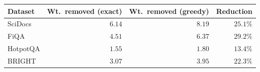 \begin{supplementtable}
  \caption{Structural gap on cyclic instances ($n=379$, pooled regimes):
    mean feedback-arc weight removed by exact versus greedy repair.
    Relative reduction is from greedy to exact. Retrieval-level
    exact-versus-greedy and exact-versus-unrepaired Holm outcomes appear
    in the accompanying text (all nonsignificant after correction).}
  \label{tab:exact-vs-greedy}
  \sncstable
  \begin{tabular}{@{}lrrr@{}}
    \toprule
    Dataset & Wt.\ removed (exact) & Wt.\ removed (greedy) & Reduction \\
    \midrule
    SciDocs  & $6.14$ & $8.19$ & $25.1\%$ \\
    \addlinespace
    FiQA     & $4.51$ & $6.37$ & $29.2\%$ \\
    \addlinespace
    HotpotQA & $1.55$ & $1.80$ & $13.4\%$ \\
    \addlinespace
    BRIGHT   & $3.07$ & $3.95$ & $22.3\%$ \\
    \bottomrule
  \end{tabular}
\end{supplementtable}